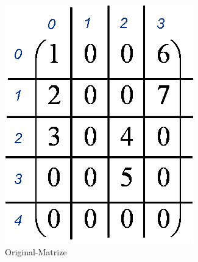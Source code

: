 \begin{figure}[htbp]
	\begin{center}
		\begin{minipage}[t]{0.4\linewidth}
			\centering
			\includegraphics[width=\linewidth]{../xby/pic/orignal_sparse}
			\caption{Original-Matrize}
			\label{orignal_sparse}
		\end{minipage}
		\qquad
		\begin{minipage}[t]{0.4\linewidth}
			\centering

\end{minipage}
\end{center}
\end{figure}
